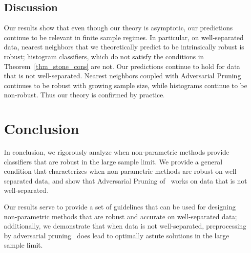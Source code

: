 \subsection{Discussion}

Our results show that even though our theory is asymptotic, our predictions continue to be relevant in finite sample regimes. In particular, on well-separated data, nearest neighbors that we theoretically predict to be intrinsically robust is robust; histogram classifiers, which do not satisfy the conditions in Theorem~\ref{thm_stone_cons} are not. Our predictions continue to hold for data that is not well-separated. Nearest neighbors coupled with Adversarial
Pruning continues to be robust with growing sample size, while histograms continue to be non-robust. Thus our theory is confirmed by practice.

\section{Conclusion}

In conclusion, we rigorously analyze when non-parametric methods provide classifiers that are robust in the large sample limit. We provide a general condition that characterizes when non-parametric methods are robust on well-separated data, and show that Adversarial Pruning of~\cite{YRWC19} works on data that is not well-separated. 

Our results serve to provide a set of guidelines that can be used for designing non-parametric methods that are robust and accurate on well-separated data; additionally, we demonstrate that when data is not well-separated, preprocessing by adversarial pruning~\cite{YRWC19} does lead to optimally astute solutions in the large sample limit. 




%
%
%
%
%
%
%